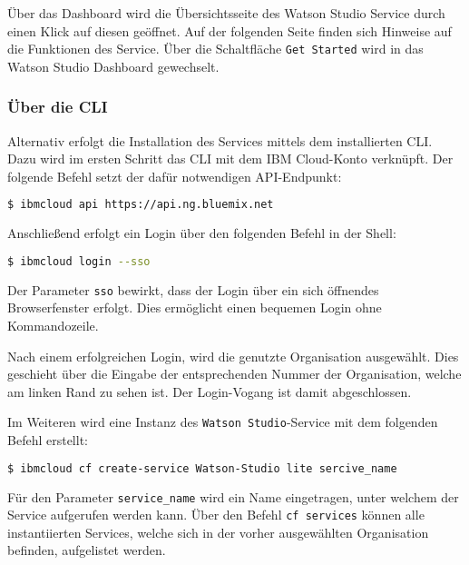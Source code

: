 Über das Dashboard wird die Übersichtsseite des Watson Studio Service durch einen Klick auf diesen geöffnet. Auf der
folgenden Seite finden sich Hinweise auf die Funktionen des Service. Über die Schaltfläche \texttt{Get Started} wird in
das Watson Studio Dashboard gewechselt.

\subsubsection*{Über die CLI}
Alternativ erfolgt die Installation des Services mittels dem installierten CLI. Dazu wird im ersten Schritt das CLI mit
dem IBM Cloud-Konto verknüpft. Der folgende Befehl setzt der dafür notwendigen API-Endpunkt:

\begin{lstlisting}[language=bash, caption=Setzen des API Targets, label=Setzen des API Targets]
    $ ibmcloud api https://api.ng.bluemix.net
\end{lstlisting}

Anschließend erfolgt ein Login über den folgenden Befehl in der Shell:

\begin{lstlisting}[language=bash, caption=Login über CLI und Single Sign-on, label=Login über CLI und SSO]
    $ ibmcloud login --sso
\end{lstlisting}

Der Parameter \texttt{sso} bewirkt, dass der Login über ein sich öffnendes Browserfenster erfolgt. Dies ermöglicht einen
bequemen Login ohne Kommandozeile.

Nach einem erfolgreichen Login, wird die genutzte Organisation ausgewählt. Dies geschieht über die Eingabe der
entsprechenden Nummer der Organisation, welche am linken Rand zu sehen ist. Der Login-Vogang ist damit abgeschlossen.

Im Weiteren wird eine Instanz des \texttt{Watson Studio}-Service mit dem folgenden Befehl erstellt:

\begin{lstlisting}[language=bash, caption=Instanziierung des Watson Studio Services, label=Instanziierung des Watson Studio Services]
    $ ibmcloud cf create-service Watson-Studio lite sercive_name
\end{lstlisting}

Für den Parameter \texttt{service\_name} wird ein Name eingetragen, unter welchem der Service aufgerufen werden kann.
Über den Befehl \texttt{cf services} können alle instantiierten Services, welche sich in der vorher ausgewählten
Organisation befinden, aufgelistet werden.

